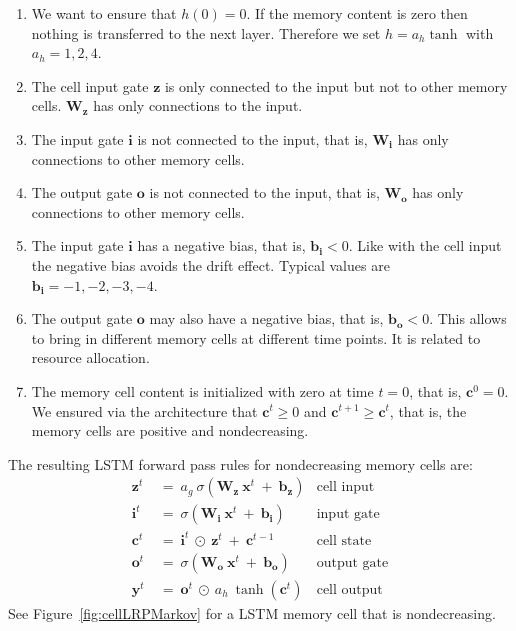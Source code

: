 \documentclass{article}
\newcommand\Bb{\bm{b}}
\newcommand\Bc{\bm{c}}
\newcommand\Bi{\bm{i}}
\newcommand\Bo{\bm{o}}
\newcommand\Bx{\bm{x}}
\newcommand\By{\bm{y}}
\newcommand\Bz{\bm{z}}
\newcommand\BW{\bm{W}}
\renewcommand{\geq}{\geqslant}
\begin{document}
\begin{appendices}
\begin{enumerate}[label=\textbf{(A\arabic*)}]
\item We want to ensure that $h(0)=0$. If the memory content is zero
  then nothing is transferred to the next layer.
  Therefore we set $h=a_h \tanh$ with $a_h=1,2,4$.

\item The cell input gate $\Bz$ is only connected to the input but not
  to other memory cells.  $\BW_{\Bz}$ has only connections to the
  input. 

\item The input gate $\Bi$ is not connected to the input, that is,
  $\BW_{\Bi}$ has only connections to other memory cells. 

\item The output gate $\Bo$ is not connected to the input, that is,
  $\BW_{\Bo}$ has only connections to other memory cells. 

\item The input gate $\Bi$ has a negative bias, that is,
  $\Bb_{\Bi}<0$. Like with the cell input the negative bias
  avoids the drift effect.
  Typical values are $\Bb_{\Bi}=-1,-2,-3,-4$.

\item The output gate $\Bo$ may also have a negative bias, that is,
  $\Bb_{\Bo}<0$. This allows to bring in different memory cells at
  different time points. It is related to resource allocation.
  
\item The memory cell content is initialized with zero at time $t=0$,
  that is, $\Bc^0=0$. We ensured via the architecture that $\Bc^t \geq 0$
  and $\Bc^{t+1} \geq \Bc^{t}$, that is, 
  the memory cells are positive and nondecreasing.
 
\end{enumerate}

The resulting LSTM forward pass rules for nondecreasing memory cells are:
\begin{align}
\Bz^t \ &= \ a_g \ \sigma \left( \BW_{\Bz} \ \Bx^t \ + \
   \Bb_{\Bz}\right) & \text{cell input} \\
\Bi^t \ &= \ \sigma \left( \BW_{\Bi} \ \Bx^t \ + \
    \Bb_{\Bi} \right) & \text{input gate} \\
\Bc^t \ &= \  \Bi^t \ \odot \ \Bz^t \ + \ \Bc^{t-1} & \text{cell state} \\
\Bo^t \ &= \ \sigma \left( \BW_{\Bo} \ \Bx^t \ + \
  \Bb_{\Bo} \right) & \text{output gate} \\
\By^t \ &= \ \Bo^t \ \odot \ a_h \ \tanh\left( \Bc^t \right) &
\text{cell output}
\end{align}
See Figure~\ref{fig:cellLRPMarkov} for a LSTM memory cell that is
nondecreasing.


\end{appendices}
\end{document}
